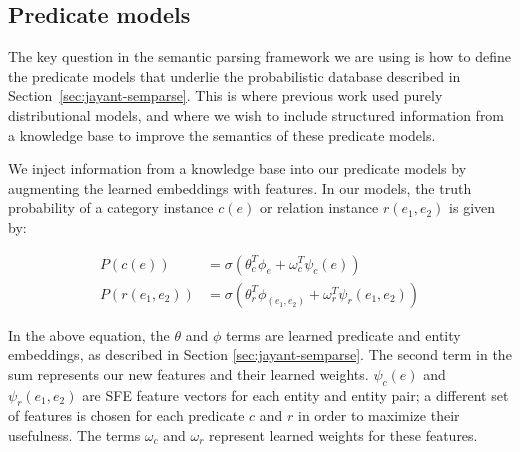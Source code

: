 \documentclass[11pt]{article}
\newcommand{\secref}[1]{Section~\ref{sec:#1}}
\newcommand{\lexicalpredicate}[1]{\ensuremath{\textit{#1}}}
\newcommand{\entity}[1]{\ensuremath{\textsc{#1}}}
\begin{document}

\subsection{Predicate models}
\label{sec:formal-and-distributional}

The key question in the semantic parsing framework we are using is how
to define the predicate models that underlie the probabilistic
database described in \secref{jayant-semparse}.  This is where
previous work used purely distributional models, and where we wish to
include structured information from a knowledge base to improve the
semantics of these predicate models.

We inject information from a knowledge base into our predicate models
by augmenting the learned embeddings with features. In our models, the
truth probability of a category instance $c(e)$ or relation instance
$r(e_1, e_2)$ is given by:

\begin{align*}
  P(c(e)) &= \sigma ( \theta_c^T \phi_e + \omega_c^T \psi_c(e)) \\
  P(r(e_1, e_2)) &= \sigma ( \theta_r^T \phi_{(e_1, e_2)} + \omega_r^T \psi_r(e_1, e_2) )
\end{align*}

In the above equation, the $\theta$ and $\phi$ terms are learned
predicate and entity embeddings, as described in Section
\ref{sec:jayant-semparse}. The second term in the sum represents our
new features and their learned weights. $\psi_c(e)$ and $\psi_r(e_1,
e_2)$ are SFE feature vectors for each entity and entity pair; a
different set of features is chosen for each predicate $c$ and $r$ in
order to maximize their usefulness. The terms $\omega_c$ and
$\omega_r$ represent learned weights for these features.
\end{document}
